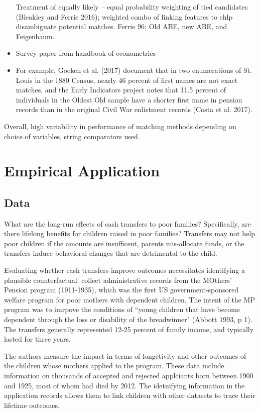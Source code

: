 \documentclass[12pt]{article}
\begin{document}
\begin{itemize}
Treatment of equally likely -- equal probability weighting of tied candidates (Bleakley and Ferrie 2016); weighted combo of linking features to ehlp disambiguate potential matches.  Ferrie 96; Old ABE, new ABE, and Feigenbaum. 


\item Survey paper from handbook of econometrics
\item For example, Goeken et al. (2017) document that
in two enumerations of St. Louis in the 1880 Census, nearly 46 percent of first names are not exact matches,
and the Early Indicators project notes that 11.5 percent of individuals in the Oldest Old sample have a
shorter first name in pension records than in the original Civil War enlistment records (Costa et al. 2017). 
\end{itemize}

Overall, high variability in performance of matching methods depending on choice of variables, string comparators used. 


\section{Empirical Application}



\subsection{Data}

What are the long-run effects of cash transfers to poor families?  Specifically, are there lifelong benefits for children raised in poor families?  Transfers may not help poor children if the amounts are insufficent, parents mis-allocate funds, or the transfers induce behavioral changes that are detrimental to the child.  

Evaluating whether cash transfers improve outcomes necessitates identifying a plausible counterfactual.  \cite{aizer2019}  collect administrative records from the MOthers' Pension program (1911-1935), which was the first US government-sponsored welfare program for poor mothers with dependent children.  The intent of the MP program was to imrpove the conditions of ``young children that have become dependent through the loss or disability of the breadwinner" (Abbott 1993, p 1).  The transfers generally represented 12-25 percent of family income, and typically lasted for three years.   

The authors measure the impact in terms of longetivity and other outcomes of the children whose mothers applied to the program.  These data include information on thousands of accepted and rejected applciants born between 1900 and 1925, most of whom had died by 2012.  The idetnifying information in the application records allows them to link children with other datasets to trace their lifetime outcomes.
\end{document}
